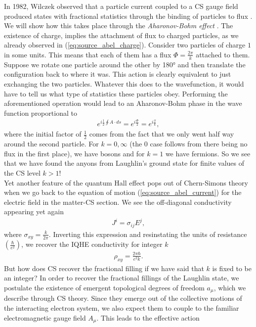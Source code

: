 In 1982, Wilczek observed that a particle current coupled to a CS gauge field produced states with fractional statistics through the binding of particles to flux \cite{Wilczek:1981du}. We will show how this takes place through the \textit{Aharonov-Bohm effect} \cite{Aharonov:1959fk, PhysRevLett.5.3}. The existence of charge, implies the attachment of flux to charged particles, as we already observed in (\ref{eq:source_abel_charge}). Consider two particles of charge $1$ in some units. This means that each of them has a flux $\Phi = \frac{2\pi}{k}$ attached to them. Suppose we rotate one particle around the other by 180° and then translate the configuration back to where it was. This action is clearly equivalent to just exchanging the two particles. Whatever this does to the wavefunction, it would have to tell us what type of statistics these particles obey. Performing the aforementioned operation would lead to an Aharonov-Bohm phase in the wave function proportional to
\begin{align}
    e^{i \frac{1}{2} \oint A \cdot ds}=e^{i \frac{\Phi}{2}}= e^{i \frac{\pi}{k}},
\end{align}
where the initial factor of $\frac{1}{2}$ comes from the fact that we only went half way around the second particle. For $k=0,\infty$ (the 0 case follows from there being no flux in the first place), we have bosons and for $k=1$ we have fermions. So we see that we have found the anyons from Laughlin's ground state for finite values of the CS level $k>1$!\\
\indent Yet another feature of the quantum Hall effect pops out of Chern-Simons theory when we go back to the equation of motion (\ref{eq:source_abel_current}) for the electric field in the matter-CS section. We see the off-diagonal conductivity appearing yet again
\begin{align}
    J^{i} = \sigma_{ij}E^j,
\end{align}
where $\sigma_{xy}=\frac{k}{2\pi}$. Inverting this expression and resinstating the units of resistance $\left(\frac{\hbar}{e^2}\right)$, we recover the IQHE conductivity for integer $k$
\begin{align}
    \rho_{xy} =\frac{2\pi \hbar}{e^2 k}.
\end{align}
But how does CS recover the fractional filling if we have said that $k$ is fixed to be an integer? In order to recover the fractional fillings of the Laughlin state, we postulate the existence of emergent topological degrees of freedom $a_{\mu}$, which we describe through CS theory. Since they emerge out of the collective motions of the interacting electron system, we also expect them to couple to the familiar electromagnetic gauge field $A_{\mu}$. This leads to the effective action
